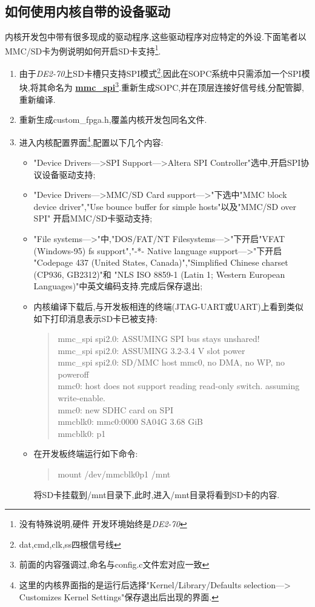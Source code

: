 \documentclass[12pt,a4paper,titlepage]{article}
\begin{document}
\subsection{如何使用内核自带的设备驱动}
内核开发包中带有很多现成的驱动程序,这些驱动程序对应特定的外设.下面笔者以MMC/SD卡为例说明如何开启SD卡支持\footnote{没有特殊说明,硬件
开发环境始终是\textit{DE2-70}}.

\begin{enumerate}
\item 由于\textit{DE2-70}上SD卡槽只支持SPI模式\footnote{dat,cmd,clk,ss四根信号线},因此在SOPC系统中只需添加一个SPI模块,将其命名为
\underline{\textbf{mmc\_spi}}\footnote{前面的内容强调过,命名与config.c文件宏对应一致}.重新生成SOPC,并在顶层连接好信号线,分配管脚,重新编译.
\item 重新生成custom\_fpga.h,覆盖内核开发包同名文件.
\item 进入内核配置界面\footnote{这里的内核界面指的是运行后选择"Kernel/Library/Defaults selection--->
Customizes Kernel Settings"保存退出后出现的界面.},配置以下几个内容:
\begin{itemize}
\item "Device Drivers--->SPI Support--->Altera SPI Controller"选中,开启SPI协议设备驱动支持;
\item "Device Drivers--->MMC/SD Card support--->"下选中"MMC block device driver","Use bounce buffer for simple hosts"以及"MMC/SD over SPI"
开启MMC/SD卡驱动支持;
\item  "File systems--->"中,"DOS/FAT/NT Filesystems--->"下开启"VFAT (Windows-95) fs support","-*- Native language support--->"下开启
"Codepage 437 (United States, Canada)","Simplified Chinese charset (CP936, GB2312)"和
"NLS ISO 8859-1  (Latin 1; Western European Languages)"中英文编码支持.完成后保存退出;
\item 内核编译下载后,与开发板相连的终端(JTAG-UART或UART)上看到类似如下打印消息表示SD卡已被支持:
\begin{quote}
mmc\_spi spi2.0: ASSUMING SPI bus stays unshared!\\
mmc\_spi spi2.0: ASSUMING 3.2-3.4 V slot power\\
mmc\_spi spi2.0: SD/MMC host mmc0, no DMA, no WP, no poweroff\\
mmc0: host does not support reading read-only switch. assuming write-enable.\\
mmc0: new SDHC card on SPI\\
mmcblk0: mmc0:0000 SA04G 3.68 GiB\\
 mmcblk0: p1\\
\end{quote}
\item 在开发板终端运行如下命令:
\begin{verse}
mount /dev/mmcblk0p1 /mnt
\end{verse}
将SD卡挂载到/mnt目录下,此时,进入/mnt目录将看到SD卡的内容.
\end{itemize}
\end{enumerate}
\end{document}
